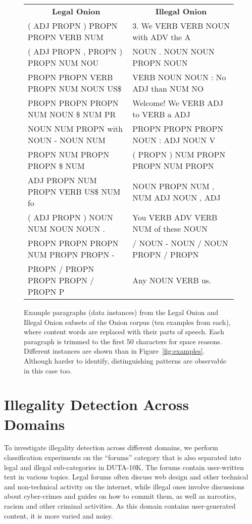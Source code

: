 \documentclass[11pt,a4paper,table]{article}
\begin{document}
\begin{figure*}[t]
\centering
\small
\begin{tabular}{l|l}
\multicolumn{1}{c}{\textbf{Legal Onion}} &
\multicolumn{1}{c}{\textbf{Illegal Onion}}\\
( ADJ PROPN ) PROPN PROPN VERB NUM &3. We VERB VERB NOUN with ADV the A\\
( ADJ PROPN , PROPN ) PROPN NUM NOU&NOUN . NOUN NOUN PROPN NOUN\\
PROPN PROPN VERB PROPN NUM NOUN US\$&VERB NOUN NOUN : No ADJ than NUM NO\\
PROPN PROPN PROPN NUM NOUN \$ NUM PR&Welcome! We VERB ADJ to VERB a ADJ \\
NOUN NUM PROPN with NOUN - NOUN NUM&PROPN PROPN PROPN NOUN : ADJ NOUN V\\
PROPN NUM PROPN PROPN \$ NUM&( PROPN ) NUM PROPN PROPN NUM PROPN\\
ADJ PROPN NUM PROPN VERB US\$ NUM fo&NOUN PROPN NUM , NUM ADJ NOUN , ADJ\\
( ADJ PROPN ) NOUN NUM NOUN NOUN . &You VERB ADV VERB NUM of these NOUN\\
PROPN PROPN PROPN NUM PROPN PROPN -&/ NOUN - NOUN / NOUN PROPN / PROPN \\
PROPN / PROPN PROPN PROPN / PROPN P&Any NOUN VERB us.\\
\end{tabular}
\caption{Example paragraphs (data instances) from the Legal Onion and
Illegal Onion subsets of the Onion corpus (ten examples from each),
where content words are replaced with their parts of speech.
Each paragraph is trimmed to the first 50 characters for space reasons.
Different instances are shown than in Figure~\ref{fig:examples}.
Although harder to identify, distinguishing patterns are observable in this case too.
\label{fig:examples_poscontent}}
\end{figure*}

\section{Illegality Detection Across Domains} \label{sec:cross_domains}

To investigate illegality detection across different domains, %
we perform classification experiments on the  ``forums'' category that is also separated into legal and illegal sub-categories in DUTA-10K.
The forums  contain user-written text in various topics. Legal forums often discuss web design and other technical
and non-technical activity on the internet, while illegal ones involve
discussions about cyber-crimes and guides on how to commit them,
as well as narcotics, racism and other criminal activities.
As this domain contains user-generated content, it is more varied
and noisy.
\end{document}
